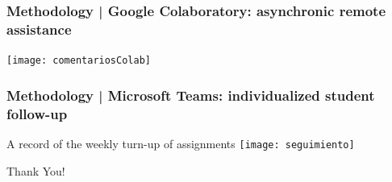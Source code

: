 \documentclass[aspectratio=169]{beamer}
\begin{document}
\begin{frame}
	\frametitle{Methodology | Google Colaboratory: asynchronic remote assistance}
	\begin{block}{}
		\texttt{[image: comentariosColab]}
	\end{block}
\end{frame}



\begin{frame}
	\frametitle{Methodology | Microsoft Teams: individualized student follow-up}
	\begin{block}{A record of the weekly turn-up of assignments}
		\texttt{[image: seguimiento]}
	\end{block}
\end{frame}




\begin{frame}%
    \begin{center}
    \Huge Thank You!
    \end{center}
\end{frame}
\end{document}
